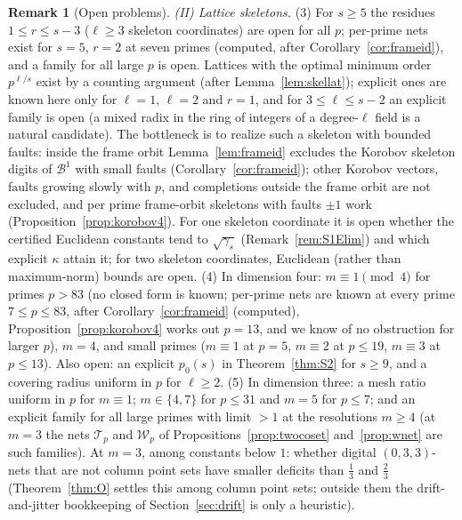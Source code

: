 \documentclass[11pt]{amsart}
\theoremstyle{definition}
\newtheorem{remark}[theorem]{Remark}
\theoremstyle{plain}
\begin{document}
\begin{remark}[Open problems]
\emph{(II) Lattice skeletons.} (3) For $s\ge5$ the residues $1\le r\le s-3$ ($\ell\ge3$ skeleton coordinates) are open for all $p$; per-prime nets exist for $s=5$, $r=2$ at seven primes (computed, after Corollary~\ref{cor:frameid}), and a family for all large $p$ is open. Lattices with the optimal minimum order $p^{\ell/s}$ exist by a counting argument (after Lemma~\ref{lem:skellat}); explicit ones are known here only for $\ell=1$, $\ell=2$ and $r=1$, and for $3\le\ell\le s-2$ an explicit family is open (a mixed radix in the ring of integers of a degree-$\ell$ field is a natural candidate). The bottleneck is to realize such a skeleton with bounded faults: inside the frame orbit Lemma~\ref{lem:frameid} excludes the Korobov skeleton digits of $\mathcal B^1$ with small faults (Corollary~\ref{cor:frameid}); other Korobov vectors, faults growing slowly with $p$, and completions outside the frame orbit are not excluded, and per prime frame-orbit skeletons with faults $\pm1$ work (Proposition~\ref{prop:korobov4}). For one skeleton coordinate it is open whether the certified Euclidean constants tend to $\sqrt{\gamma_s}$ (Remark~\ref{rem:S1Elim}) and which explicit $\kappa$ attain it; for two skeleton coordinates, Euclidean (rather than maximum-norm) bounds are open. (4) In dimension four: $m\equiv1\pmod4$ for primes $p>83$ (no closed form is known; per-prime nets are known at every prime $7\le p\le83$, after Corollary~\ref{cor:frameid} (computed), Proposition~\ref{prop:korobov4} works out $p=13$, and we know of no obstruction for larger $p$), $m=4$, and small primes ($m\equiv1$ at $p=5$, $m\equiv2$ at $p\le19$, $m\equiv3$ at $p\le13$). Also open: an explicit $p_0(s)$ in Theorem~\ref{thm:S2} for $s\ge9$, and a covering radius uniform in $p$ for $\ell\ge2$. (5) In dimension three: a mesh ratio uniform in $p$ for $m\equiv1$; $m\in\{4,7\}$ for $p\le31$ and $m=5$ for $p\le7$; and an explicit family for all large primes with limit $>1$ at the resolutions $m\ge4$ (at $m=3$ the nets $\mathcal T_p$ and $\mathcal W_p$ of Propositions~\ref{prop:twocoset} and~\ref{prop:wnet} are such families). At $m=3$, among constants below $1$: whether digital $(0,3,3)$-nets that are not column point sets have smaller deficits than $\frac13$ and $\frac23$ (Theorem~\ref{thm:O} settles this among column point sets; outside them the drift-and-jitter bookkeeping of Section~\ref{sec:drift} is only a heuristic).


\end{remark}
\end{document}
